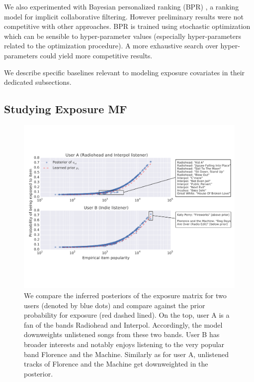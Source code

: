 We also experimented with Bayesian personalized ranking (BPR)
\cite{rendle2009bpr}, a ranking model for implicit collaborative filtering. However preliminary results were not competitive with other
approaches. BPR is trained using stochastic optimization which can be
sensible to hyper-parameter values (especially hyper-parameters related to
the optimization procedure). A more exhaustive search over hyper-parameters
could yield more competitive results. 

We describe specific baselines relevant to modeling exposure covariates
in their dedicated subsections.

\subsection{Studying Exposure MF} 
\label{sec:expomf_study}


\begin{figure}[!tbp]
  \centering
   \includegraphics[width=.9\textwidth]{fig/rh_fl}
   \caption{We compare the inferred posteriors of the exposure matrix for two
  users (denoted by blue dots) and compare against the prior probability for exposure (red dashed lined). On the top, user A is a fan of the bands Radiohead and Interpol. 
  Accordingly, the model downweights unlistened songs from these two
  bands. User B has broader interests and notably enjoys listening to
  the very popular band Florence and the Machine. Similarly as for user A,
  unlistened tracks of Florence and the Machine get downweighted in the
   posterior.}
  \label{fig:expo_exp}
\end{figure}


